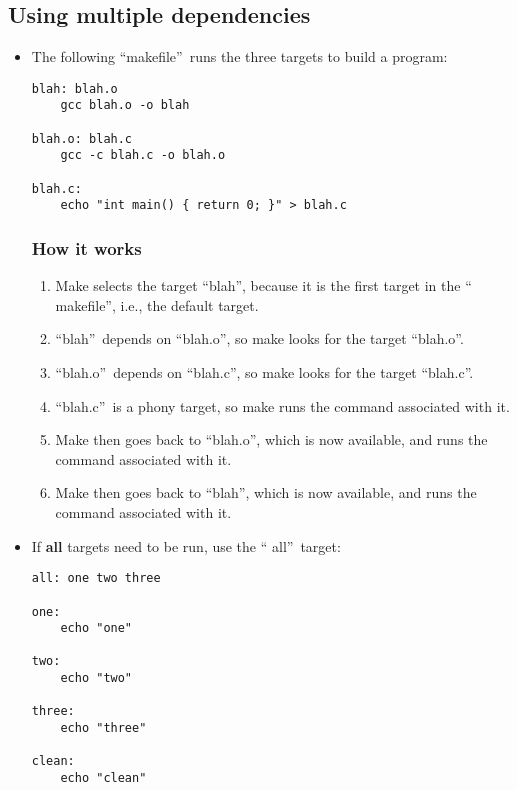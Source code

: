 \subsection{Using multiple dependencies}
\begin{itemize}
    \item The following \textquotedblleft makefile\textquotedblright\ runs the
    three targets to build a program:
    \begin{verbatim}
blah: blah.o
    gcc blah.o -o blah

blah.o: blah.c
    gcc -c blah.c -o blah.o

blah.c:
    echo "int main() { return 0; }" > blah.c
    \end{verbatim}
    \subsubsection{How it works}
    \begin{enumerate}
        \item Make selects the target \textquotedblleft blah\textquotedblright,
        because it is the first target in the \textquotedblleft 
        makefile\textquotedblright, i.e., the default target.
        \item \textquotedblleft blah\textquotedblright\ depends on 
        \textquotedblleft blah.o\textquotedblright, so make looks for the
        target \textquotedblleft blah.o\textquotedblright.
        \item \textquotedblleft blah.o\textquotedblright\ depends on
        \textquotedblleft blah.c\textquotedblright, so make looks for the
        target \textquotedblleft blah.c\textquotedblright.
        \item \textquotedblleft blah.c\textquotedblright\ is a phony target,
        so make runs the command associated with it.
        \item Make then goes back to \textquotedblleft blah.o\textquotedblright,
        which is now available, and runs the command associated with it.
        \item Make then goes back to \textquotedblleft blah\textquotedblright,
        which is now available, and runs the command associated with it.
    \end{enumerate}
    \item If \textbf{all} targets need to be run, use the \textquotedblleft
    all\textquotedblright\ target:
    \begin{verbatim}
all: one two three

one:
    echo "one"

two:
    echo "two"

three:
    echo "three"

clean:
    echo "clean"
    \end{verbatim}
\end{itemize}

